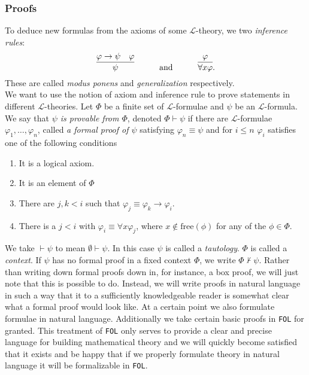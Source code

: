 \subsubsection{Proofs}
To deduce new formulas from the axioms of some $\mathcal{L}$-theory, we two \emph{inference rules}: 
$$\infer{\psi}{\varphi \to \psi & \varphi} \quad \quad \quad\text{and}\quad \quad \quad  \infer{\forall x \varphi}{\varphi}.$$
These are called \emph{modus ponens} and \emph{generalization} respectively.\\
We want to use the notion of axiom and inference rule to prove statements in different $\mathcal{L}$-theories. Let $\Phi$ be a finite set of $\mathcal{L}$-formulae and $\psi$ be an $\mathcal{L}$-formula. We say that \emph{$\psi$ is provable from $\Phi$}, denoted $\Phi\vdash \psi$ if there are $\mathcal{L}$-formulae $\varphi_1,\dots,\varphi_n$, called \emph{a formal proof of $\psi$} satisfying $\varphi_n\equiv \psi$ and for $i\leq n$ $\varphi_i$ satisfies one of the following conditions 
\begin{enumerate}
    \item It is a logical axiom.
    \item It is an element of $\Phi$
    \item There are $j,k< i$ such that $\varphi_j\equiv \varphi_k \to \varphi_i$.
    \item There is a $j<i$ with $\varphi_i \equiv \forall x \varphi_j$, where $x\notin \mathrm{free}(\phi)$ for any of the $\phi\in \Phi$.
\end{enumerate} 
We take $\vdash \psi$ to mean $\emptyset \vdash \psi$. In this case $\psi$ is called a \emph{tautology}. $\Phi$ is called a \emph{context}. If $\psi$ has no formal proof in a fixed context $\Phi$, we write $\Phi \not\vdash \psi$. Rather than writing down formal proofs down in, for instance, a box proof, we will just note that this is possible to do. Instead, we will write proofs in natural language in such a way that it to a sufficiently knowledgeable reader is somewhat clear what a formal proof would look like. At a certain point we also formulate formulae in natural language. Additionally we take certain basic proofs in \verb|FOL| for granted. This treatment of \verb|FOL| only serves to provide a clear and precise language for building mathematical theory and we will quickly become satisfied that it exists and be happy that if we properly formulate theory in natural language it will be formalizable in \verb|FOL|.  
